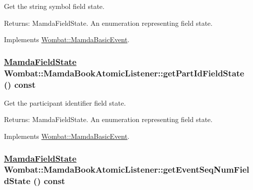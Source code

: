 Get the string symbol field state. 

\begin{Desc}
\item[Returns:]Mamda\-Field\-State. An enumeration representing field state. \end{Desc}


Implements \hyperlink{classWombat_1_1MamdaBasicEvent_ef95e19f4babb0e5ea8549d6cf29d13f}{Wombat::Mamda\-Basic\-Event}.\hypertarget{classWombat_1_1MamdaBookAtomicListener_43081dcece02d10a8291cd9326c550f3}{
\subsubsection[getPartIdFieldState]{\setlength{\rightskip}{0pt plus 5cm}\hyperlink{namespaceWombat_93aac974f2ab713554fd12a1fa3b7d2a}{Mamda\-Field\-State} Wombat::Mamda\-Book\-Atomic\-Listener::get\-Part\-Id\-Field\-State () const}}
\label{classWombat_1_1MamdaBookAtomicListener_43081dcece02d10a8291cd9326c550f3}


Get the participant identifier field state. 

\begin{Desc}
\item[Returns:]Mamda\-Field\-State. An enumeration representing field state. \end{Desc}


Implements \hyperlink{classWombat_1_1MamdaBasicEvent_c361c99af2cf7eb9f5621d89f744fc62}{Wombat::Mamda\-Basic\-Event}.\hypertarget{classWombat_1_1MamdaBookAtomicListener_3ee620bcb87714cb80033e9eeda630dc}{
\subsubsection[getEventSeqNumFieldState]{\setlength{\rightskip}{0pt plus 5cm}\hyperlink{namespaceWombat_93aac974f2ab713554fd12a1fa3b7d2a}{Mamda\-Field\-State} Wombat::Mamda\-Book\-Atomic\-Listener::get\-Event\-Seq\-Num\-Field\-State () const}}
\label{classWombat_1_1MamdaBookAtomicListener_3ee620bcb87714cb80033e9eeda630dc}


